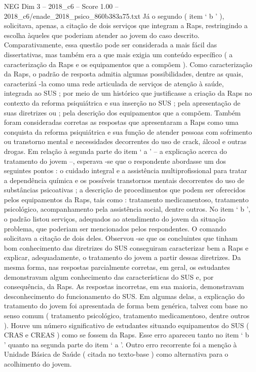 \begin{textsample}{NEG Dim 3 – 2018\_c6 – Score 1.00 – 2018\_c6/enade\_2018\_psico\_860b383a75.txt}
Já o segundo ( item ‘ b ’ ), solicitava, apenas, a citação de dois serviços que integram a Raps, restringindo a escolha àqueles que poderiam atender ao jovem do caso descrito.
Comparativamente, essa questão pode ser considerada a mais fácil das dissertativas, mas também era a que mais exigia um conteúdo específico ( a caracterização da Raps e os equipamentos que a compõem ).
Como caracterização da Raps, o padrão de resposta admitia algumas possibilidades, dentre as quais, caracterizá -la como uma rede articulada de serviços de atenção à saúde, integrada ao SUS ; por meio de um histórico que justificasse a criação da Raps no contexto da reforma psiquiátrica e sua inserção no SUS ; pela apresentação de suas diretrizes ou ; pela descrição dos equipamentos que a compõem.
Também foram consideradas corretas as respostas que apresentaram a Raps como uma conquista da reforma psiquiátrica e sua função de atender pessoas com sofrimento ou transtorno mental e necessidades decorrentes do uso de crack, álcool e outras drogas.
Em relação à segunda parte do item ‘ a ’ – a explicação acerca do tratamento do jovem –, esperava -se que o respondente abordasse um dos seguintes pontos : o cuidado integral e a assistência multiprofissional para tratar a dependência química e os possíveis transtornos mentais decorrentes do uso de substâncias psicoativas ; a descrição de procedimentos que podem ser oferecidos pelos equipamentos da Raps, tais como : tratamento medicamentoso, tratamento psicológico, acompanhamento pela assistência social, dentre outros.
No item ‘ b ’, o padrão listou serviços, adequados ao atendimento do jovem da situação problema, que poderiam ser mencionados pelos respondentes.
O comando solicitava a citação de dois deles.
Observou -se que os concluintes que tinham bom conhecimento das diretrizes do SUS conseguiram caracterizar bem a Raps e explicar, adequadamente, o tratamento do jovem a partir dessas diretrizes.
Da mesma forma, nas respostas parcialmente corretas, em geral, os estudantes demonstravam algum conhecimento das características do SUS e, por consequência, da Raps.
As respostas incorretas, em sua maioria, demonstravam desconhecimento do funcionamento do SUS.
Em algumas delas, a explicação do tratamento do jovem foi apresentada de forma bem genérica, talvez com base no senso comum ( tratamento psicológico, tratamento medicamentoso, dentre outros ).
Houve um número significativo de estudantes situando equipamentos do SUS ( CRAS e CREAS ) como se fossem da Raps.
Esse erro apareceu tanto no item ‘ b ’ quanto na segunda parte do item ‘ a ’.
Outro erro recorrente foi a menção à Unidade Básica de Saúde ( citada no texto-base ) como alternativa para o acolhimento do jovem.

\end{textsample}
